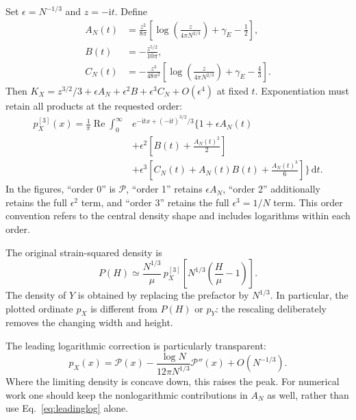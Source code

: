 \documentclass[11pt]{article}
\newcommand{\dd}{\mathrm d}
\newcommand{\ii}{\mathrm i}
\newcommand{\Pstable}{\mathcal P}
\newcommand{\gE}{\gamma_{\!E}}
\newcommand{\eps}{\epsilon}
\begin{document}
Set $\eps=N^{-1/3}$ and $z=-\ii t$. Define
\begin{align}
 A_N(t)&=\frac{z^2}{8\pi}
  \left[\log\!\left(\frac{z}{4\pi N^{2/3}}\right)
  +\gE-\frac12\right],\label{eq:A}\\
 B(t)&=-\frac{z^{5/2}}{10\pi},\label{eq:B}\\
 C_N(t)&=-\frac{z^3}{48\pi^2}
  \left[\log\!\left(\frac{z}{4\pi N^{2/3}}\right)
  +\gE-\frac43\right].\label{eq:C}
\end{align}
Then $K_X=z^{3/2}/3+\eps A_N+\eps^2B+\eps^3C_N+O(\eps^4)$ at fixed
$t$. Exponentiation must retain all products at the requested order:
\begin{equation}
\boxed{\begin{aligned}
 p_X^{[3]}(x)=\frac1\pi\operatorname{Re}
 \int_0^\infty &e^{-\ii tx+(-\ii t)^{3/2}/3}
 \Bigg\{1+\eps A_N(t)\\
 &+\eps^2\left[B(t)+\frac{A_N(t)^2}{2}\right]\\
 &+\eps^3\left[C_N(t)+A_N(t)B(t)
              +\frac{A_N(t)^3}{6}\right]\Bigg\}\,\dd t.
\end{aligned}}
\label{eq:pdfthird}
\end{equation}
In the figures, ``order 0'' is $\Pstable$, ``order 1'' retains $\eps A_N$,
``order 2'' additionally retains the full $\eps^2$ term, and ``order 3''
retains the full $\eps^3=1/N$ term. This order convention refers to the
central density shape and includes logarithms within each order.

The original strain-squared density is
\begin{equation}
 \boxed{\displaystyle
 P(H)\simeq\frac{N^{1/3}}{\mu}\,
 p_X^{[3]}\!\left[N^{1/3}\left(\frac{H}{\mu}-1\right)\right].}
 \label{eq:physicaldensity}
\end{equation}
The density of $Y$ is obtained by replacing the prefactor by $N^{1/3}$.
In particular, the plotted ordinate $p_X$ is different from $P(H)$ or
$p_Y$: the rescaling deliberately removes the changing width and height.

The leading logarithmic correction is particularly transparent:
\begin{equation}
 p_X(x)=\Pstable(x)
 -\frac{\log N}{12\pi N^{1/3}}\Pstable''(x)
 +O(N^{-1/3}).
 \label{eq:leadinglog}
\end{equation}
Where the limiting density is concave down, this raises the peak. For
numerical work one should keep the nonlogarithmic contributions in $A_N$
as well, rather than use Eq.~\eqref{eq:leadinglog} alone.
\end{document}
